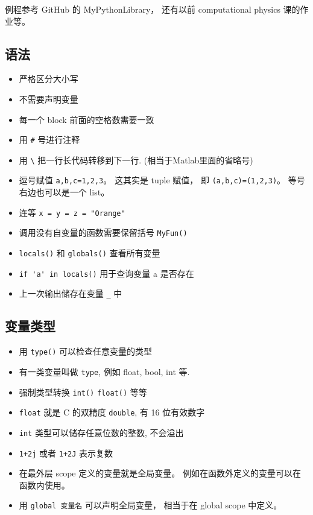 
\begin{issues}
\issueDraft
\end{issues}

例程参考 GitHub 的 MyPythonLibrary， 还有以前 computational physics 课的作业等。

\subsection{语法}
\begin{itemize}
\item 严格区分大小写
\item 不需要声明变量
\item 每一个 block 前面的空格数需要一致
\item 用 \verb|#| 号进行注释
\item 用 \verb|\| 把一行长代码转移到下一行. (相当于Matlab里面的省略号)
\item 逗号赋值 \verb`a,b,c=1,2,3`。 这其实是 tuple 赋值， 即 \verb|(a,b,c)=(1,2,3)|。 等号右边也可以是一个 list。
\item 连等 \verb|x = y = z = "Orange"|
\item 调用没有自变量的函数需要保留括号  \verb`MyFun()`
\item \verb`locals()` 和 \verb`globals()` 查看所有变量
\item \verb`if 'a' in locals()` 用于查询变量 a 是否存在
\item 上一次输出储存在变量 \verb`_` 中
\end{itemize}

\subsection{变量类型}
\begin{itemize}
\item 用 \verb`type()` 可以检查任意变量的类型
\item 有一类变量叫做 \verb`type`, 例如 float, bool, int 等.
\item 强制类型转换 \verb`int()` \verb`float()` 等等
\item \verb`float` 就是 C 的双精度 \verb|double|, 有 16 位有效数字
\item \verb|int| 类型可以储存任意位数的整数, 不会溢出
\item \verb`1+2j` 或者 \verb`1+2J` 表示复数
\item 在最外层 scope 定义的变量就是全局变量。 例如在函数外定义的变量可以在函数内使用。
\item 用 \verb|global 变量名| 可以声明全局变量， 相当于在 global scope 中定义。
\end{itemize}

